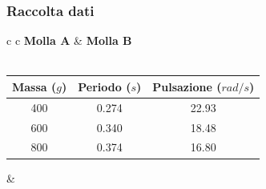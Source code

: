 \subsubsection{Raccolta dati}

\begin{center}

\begin{tabular}{c c}
\textbf{Molla A} & \hspace{2cm} \textbf{Molla B}\\
\\
\begin{tabular}{c | c| c}
Massa ($g$) & Periodo ($s$) & Pulsazione ($rad/s$)\\
\midrule
400 & 0.274 & 22.93\\
600 & 0.340 & 18.48\\
800 & 0.374 & 16.80\\
\end{tabular}

& \hspace{2cm}


\end{tabular}
\end{center}
